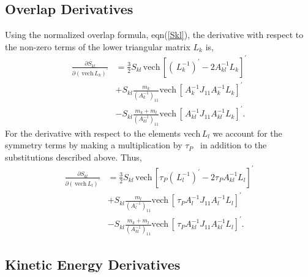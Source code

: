 \documentclass[12pt]{article}
\begin{document}
\subsection{Overlap Derivatives}

Using the normalized overlap formula, eqn(\ref{Skl}), the derivative with
respect to the non-zero terms of the lower triangular matrix $L_{k}$ is,
\begin{align}
\frac{\partial S_{kl}}{\partial\left(  \,\mathrm{vech}\,L_{k}\right)
^{\prime}}  & =\frac{3}{2}S_{kl}\,\mathrm{vech}\,\left[  \left(  \,L_{k}%
^{-1}\right)  ^{\prime}-2A_{kl}^{-1}L_{k}\right]  ^{\prime}\nonumber\\
& +S_{kl}\frac{m_{k}}{\left(  A_{k}^{-1}\right)  _{11}}\mathrm{vech}\,\left[
\,A_{k}^{-1}J_{11}A_{k}^{-1}L_{k}\right]  ^{\prime}\nonumber\\
& -S_{kl}\frac{m_{k}+m_{l}}{\left(  A_{kl}^{-1}\right)  _{11}}\mathrm{vech}%
\,\left[  \,A_{kl}^{-1}J_{11}A_{kl}^{-1}L_{k}\right]  ^{\prime}.
\end{align}
For the derivative with respect to the elements $\mathrm{vech}\,L_{l}$ we
account for the symmetry terms by making a multiplication by $\tau_{P}$ \ in
addition to the substitutions described above. Thus,
\begin{align}
\frac{\partial S_{kl}}{\partial\left(  \,\mathrm{vech}\,L_{l}\right)
^{\prime}}  & =\frac{3}{2}S_{kl}\,\mathrm{vech}\,\left[  \tau_{P}\left(
\,L_{l}^{-1}\right)  ^{\prime}-2\tau_{P}A_{kl}^{-1}L_{l}\right]  ^{\prime
}\nonumber\\
& +S_{kl}\frac{m_{l}}{\left(  A_{l}^{-1}\right)  _{11}}\mathrm{vech}\,\left[
\,\tau_{P}A_{l}^{-1}J_{11}A_{l}^{-1}L_{l}\right]  ^{\prime}\nonumber\\
& -S_{kl}\frac{m_{k}+m_{l}}{\left(  A_{kl}^{-1}\right)  _{11}}\mathrm{vech}%
\,\left[  \,\tau_{P}A_{kl}^{-1}J_{11}A_{kl}^{-1}L_{l}\right]  ^{\prime}.
\end{align}

\subsection{Kinetic Energy Derivatives}
\end{document}
